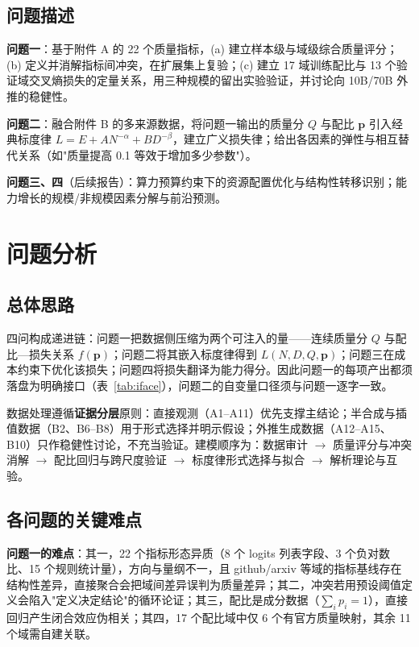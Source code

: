 \documentclass[11pt]{article}
\begin{document}
\subsection{问题描述}

\textbf{问题一}：基于附件 A 的 22 个质量指标，(a) 建立样本级与域级综合质量评分；(b) 定义并消解指标间冲突，在扩展集上复验；(c) 建立 17 域训练配比与 13 个验证域交叉熵损失的定量关系，用三种规模的留出实验验证，并讨论向 10B/70B 外推的稳健性。

\textbf{问题二}：融合附件 B 的多来源数据，将问题一输出的质量分 $Q$ 与配比 $\bm p$ 引入经典标度律 $L=E+AN^{-\alpha}+BD^{-\beta}$，建立广义损失律；给出各因素的弹性与相互替代关系（如"质量提高 0.1 等效于增加多少参数"）。

\textbf{问题三、四}（后续报告）：算力预算约束下的资源配置优化与结构性转移识别；能力增长的规模/非规模因素分解与前沿预测。

\section{问题分析}

\subsection{总体思路}

四问构成递进链：问题一把数据侧压缩为两个可注入的量——连续质量分 $Q$ 与配比—损失关系 $f(\bm p)$；问题二将其嵌入标度律得到 $L(N,D,Q,\bm p)$；问题三在成本约束下优化该损失；问题四将损失翻译为能力得分。因此问题一的每项产出都须落盘为明确接口（表~\ref{tab:iface}），问题二的自变量口径须与问题一逐字一致。

数据处理遵循\textbf{证据分层}原则：直接观测（A1--A11）优先支撑主结论；半合成与插值数据（B2、B6--B8）用于形式选择并明示假设；外推生成数据（A12--A15、B10）只作稳健性讨论，不充当验证。建模顺序为：数据审计 $\to$ 质量评分与冲突消解 $\to$ 配比回归与跨尺度验证 $\to$ 标度律形式选择与拟合 $\to$ 解析理论与互验。

\subsection{各问题的关键难点}

\textbf{问题一的难点}：其一，22 个指标形态异质（8 个 logits 列表字段、3 个负对数比、15 个规则统计量），方向与量纲不一，且 github/arxiv 等域的指标基线存在结构性差异，直接聚合会把域间差异误判为质量差异；其二，冲突若用预设阈值定义会陷入"定义决定结论"的循环论证；其三，配比是成分数据（$\sum_ip_i=1$），直接回归产生闭合效应伪相关；其四，17 个配比域中仅 6 个有官方质量映射，其余 11 个域需自建关联。
\end{document}
